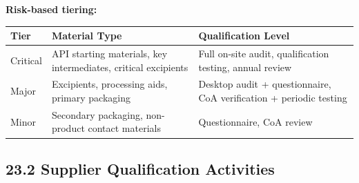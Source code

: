 \documentclass[
  11pt,
  a4paper,
]{report}
\begin{document}
\textbf{Risk-based tiering:}

\begin{longtable}[]{@{}lll@{}}
\toprule
\begin{minipage}[b]{0.14\columnwidth}\raggedright
Tier\strut
\end{minipage} & \begin{minipage}[b]{0.33\columnwidth}\raggedright
Material Type\strut
\end{minipage} & \begin{minipage}[b]{0.44\columnwidth}\raggedright
Qualification Level\strut
\end{minipage}\tabularnewline
\midrule
\endhead
\begin{minipage}[t]{0.14\columnwidth}\raggedright
Critical\strut
\end{minipage} & \begin{minipage}[t]{0.33\columnwidth}\raggedright
API starting materials, key intermediates, critical excipients\strut
\end{minipage} & \begin{minipage}[t]{0.44\columnwidth}\raggedright
Full on-site audit, qualification testing, annual review\strut
\end{minipage}\tabularnewline
\begin{minipage}[t]{0.14\columnwidth}\raggedright
Major\strut
\end{minipage} & \begin{minipage}[t]{0.33\columnwidth}\raggedright
Excipients, processing aids, primary packaging\strut
\end{minipage} & \begin{minipage}[t]{0.44\columnwidth}\raggedright
Desktop audit + questionnaire, CoA verification + periodic testing\strut
\end{minipage}\tabularnewline
\begin{minipage}[t]{0.14\columnwidth}\raggedright
Minor\strut
\end{minipage} & \begin{minipage}[t]{0.33\columnwidth}\raggedright
Secondary packaging, non-product contact materials\strut
\end{minipage} & \begin{minipage}[t]{0.44\columnwidth}\raggedright
Questionnaire, CoA review\strut
\end{minipage}\tabularnewline
\bottomrule
\end{longtable}

\hypertarget{supplier-qualification-activities}{%
\subsection{23.2 Supplier Qualification
Activities}\label{supplier-qualification-activities}}
\end{document}
